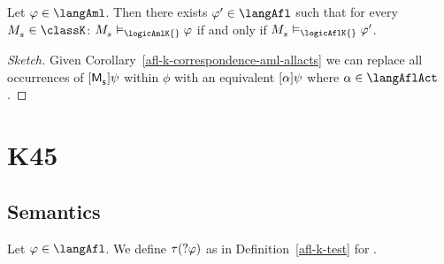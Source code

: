 \begin{corollary}\label{afl-k-correspondence-afl-aml}
Let $\phi \in \langAml$. 
Then there exists $\phi' \in \langAfl$ such that for every $\kPModel{\kStateS} \in \classK$: $\kPModel{\kStateS} \entails_\logicAmlK{} \phi$ if and only if $\kPModel{\kStateS} \entails_\logicAflK{} \phi'$.
\end{corollary}

\begin{proof}[Sketch]
Given Corollary~\ref{afl-k-correspondence-aml-allacts} we can replace all occurrences of $\actionA{\aPModel{\aStateS}} \psi$ within $\phi$ with an equivalent ${[ {\alpha} ]} \psi$ where $\alpha \in \langAflAct$.
\end{proof}

\section{K45}

\subsection{Semantics}

\begin{definition}[Test]\label{afl-kff-test}
Let $\phi \in \langAfl$.
We define $\tau(?{\varphi})$ as in Definition~\ref{afl-k-test} for \classK{}.
\end{definition}

